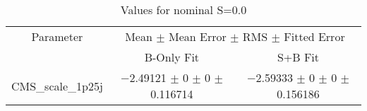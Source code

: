 \begin{table}
\centering
\caption{Values for nominal S=0.0}
\begin{tabular}{ccc}
\toprule
Parameter & \multicolumn{2}{c}{Mean $\pm$ Mean Error $\pm$ RMS $\pm$ Fitted Error}\\
 & B-Only Fit & S+B Fit\\
\midrule
CMS\_scale\_1p25j & \num{-2.49121} $\pm$ \num{0} $\pm$ \num{0} $\pm$ \num{0.116714} & \num{-2.59333} $\pm$ \num{0} $\pm$ \num{0} $\pm$ \num{0.156186}\\
\bottomrule
\end{tabular}
\end{table}
